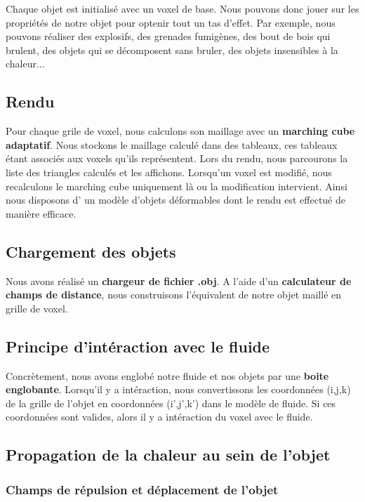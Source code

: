 \documentclass[a4paper,10pt]{article}
\begin{document}
Chaque objet est initialisé avec un voxel de base. Nous pouvons donc jouer sur les propriétés
de notre objet pour optenir tout un tas d'effet. Par exemple, nous pouvons réaliser des
explosifs, des grenades fumigènes, des bout de bois qui brulent, des objets
qui se décomposent sans bruler, des objets insensibles à la chaleur...

\subsection{Rendu}
Pour chaque grile de voxel, nous calculons son maillage avec un \textbf{marching cube adaptatif}.
Nous stockons le maillage calculé dans des tableaux, ces tableaux étant associés aux voxels
qu'ils représentent. Lors du rendu, nous parcourons la liste des triangles calculés
et les affichons. Lorsqu'un voxel est modifié, nous recalculons le marching cube uniquement
là ou la modification intervient. Ainsi nous disposons d' un modèle d'objets déformables
dont le rendu est effectué de manière efficace.

\subsection{Chargement des objets}
Nous avons réalisé un \textbf{chargeur de fichier .obj}. A l'aide d'un \textbf{calculateur de
champs de distance}, nous construisons l'équivalent de notre objet maillé en grille de voxel.


\subsection{Principe d'intéraction avec le fluide}
Concrètement, nous avons englobé notre fluide et nos objets par une \textbf{boite englobante}.
Lorsqu'il y a intéraction, nous convertissons les coordonnées (i,j,k) de la grille de
l'objet en coordonnées (i',j',k') dans le modèle de fluide. Si ces coordonnées sont 
valides, alors il y a intéraction du voxel avec le fluide.\\




\subsection{Propagation de la chaleur au sein de l'objet}

\subsubsection{Champs de répulsion et déplacement de l'objet}
\end{document}
